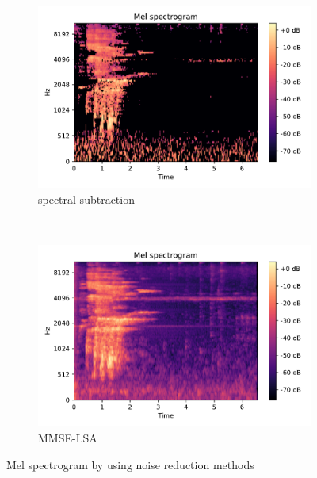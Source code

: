 \begin{figure}[!htp]
     \begin{subfigure}[b]{0.5\linewidth}
         \centering
		\includegraphics[scale=0.5]{Figs/chap3/sub_spec.pdf}
		\caption{spectral subtraction}
		\label{fig:spec_sub}
     \end{subfigure}
     ~
     \begin{subfigure}[b]{0.5\linewidth}
         \centering
		\includegraphics[scale=0.5]{Figs/chap3/logmmse.pdf}
		\caption{MMSE-LSA}
		\label{fig:logmmse}
     \end{subfigure}
  \caption{Mel spectrogram by using noise reduction methods}
  \label{Fig:denoise}
\end{figure}
